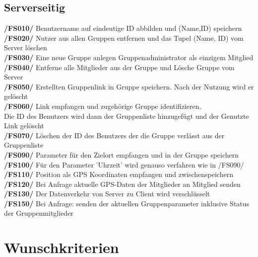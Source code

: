 \subsection{Serverseitig}
     \textbf{/FS010/} Benutzername auf eindeutige ID abbilden und (Name,ID) speichern\\
     \textbf{/FS020/} Nutzer aus allen Gruppen entfernen und das Tupel (Name, ID) vom Server löschen \\
     \textbf{/FS030/} Eine neue Gruppe anlegen Gruppenadministrator als einzigem Mitglied\\
     \textbf{/FS040/} Entferne alle Mitglieder aus der Gruppe und Lösche Gruppe vom Server\\
     \textbf{/FS050/} Erstellten Gruppenlink in Gruppe speichern. Nach der Nutzung wird er gelöscht\\
     \textbf{/FS060/} Link empfangen und zugehörige Gruppe identifizieren.\\ Die ID des Benutzers wird dann der Gruppenliste hinzugefügt und der Genutzte Link gelöscht\\
     \textbf{/FS070/} Löschen der ID des Benutzers der die Gruppe verlässt aus der Gruppenliste\\
     \textbf{/FS090/} Parameter für den Zielort empfangen und in der Gruppe speichern\\
     \textbf{/FS100/} Für den Parameter 'Uhrzeit' wird genauso verfahren wie in /FS090/ \\
     \textbf{/FS110/} Position als GPS Koordinaten empfangen und zwischenspeichern\\
     \textbf{/FS120/} Bei Anfrage aktuelle GPS-Daten der Mitglieder an Mitglied senden \\
     \textbf{/FS130/} Der Datenverkehr von Server zu Client wird verschlüsselt\\
     \textbf{/FS150/} Bei Anfrage: senden der aktuellen Gruppenparameter inklusive Status der Gruppenmitglieder\\
\section{Wunschkriterien}
